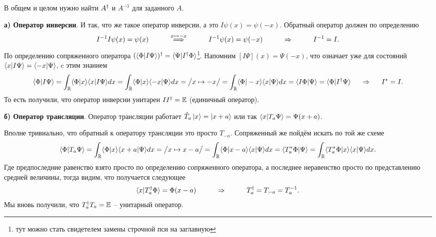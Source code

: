 В общем и целом нужно найти $A^{\dag}$ и $A^{-1}$ для заданного $A$. 


\textbf{а) Оператор инверсии}. И так, что же такое оператор инверсии, а это $I \psi(x) = \psi(-x)$.
Обратный оператор должен по определению
\begin{equation*}
	I^{-1} I \psi(x) = \psi(x)
	\hspace{1 cm}
	\overset{x \mapsto -x}{\Longrightarrow}
	\hspace{1 cm}
	I^{-1} \psi(x) = \psi(-x)
	\hspace{1 cm}
	\Rightarrow
	\hspace{1 cm}
	I^{-1} = I.
\end{equation*}
По определению сопряженного оператора $(\bk{\Phi}{I \Psi})\con = \bk{\Psi}{I\con \Phi}$\footnote{тут можно стать свидетелем замены строчной пси на заглавную}.
Напомним
$[I\Psi](x) = \Psi(-x)$, что означает уже для состояний $\bk{x}{I \Psi} = \bk{- x}{\Psi}$, c этим знанием
\begin{equation*}
	\bk{\Phi}{I \Psi} = \int_{\mathbb{R}} \bk{\Phi}{x} \bk{x}{I \Psi} d x
	=
	\int_{\mathbb{R}} \bk{\Phi}{x}\bk{-x}{\Psi} d x =\big/ x \mapsto - x \big/ =  \int_{\mathbb{R}} \bk{\Phi}{- x}\bk{x}{\Psi} d x
	=
	\bk{I \Phi}{\Psi} = \bk{\Phi}{I\con \Psi}
	\hspace{0.5 cm}
	\Rightarrow
	\hspace{0.5 cm}
	I^{*} = I.
\end{equation*}
То есть получили, что оператор инверсии унитарен $I I^{\dag} = \mathbb{E}$ (единичный оператор).

\textbf{б) Оператор трансляции}.
Оператор трансляции работает $\hat{T}_a \left| x \right\rangle = \left| x+a \right\rangle$ или так $\bk{x}{T_a\Psi} = \Psi(x + a)$.

Вполне тривиально, что обратный к оператору трансляции это просто $T_{-a}$. Сопряженный же пойдём искать по той же схеме
\begin{equation*}
	\bk{\Phi}{T_a \Psi} = \int_{\mathbb{R}} \bk{\Phi}{x} \bk{x+a}{\Psi} d x 
	= 
	\big/ x \mapsto x - a\big/
	=
	\int_{\mathbb{R}} \bk{\Phi}{x-a} \bk{x}{\Psi} d x 
	=
	\bk{T_a^{*}\Phi}{\Psi}
	=
	\int_{\mathbb{R}} \bk{T_a^{*}\Phi}{x} \bk{x}{\Psi} d x. 
\end{equation*}
Где предпоследние равенство взято просто по определению сопряженного оператора, а последнее неравенство просто по представлению средней величины, тогда видим, что получается следующее
\begin{equation*}
	\bk{x}{T_a\con \Phi} = \Phi(x-a)
	\hspace{1 cm}
	\Rightarrow
	\hspace{1 cm}
	T_a\con = T_{-a} = T_a^{-1}.
\end{equation*}
Мы вновь получили, что $T_a^{\dag} T_a = \mathbb{E}$ -- унитарный оператор.